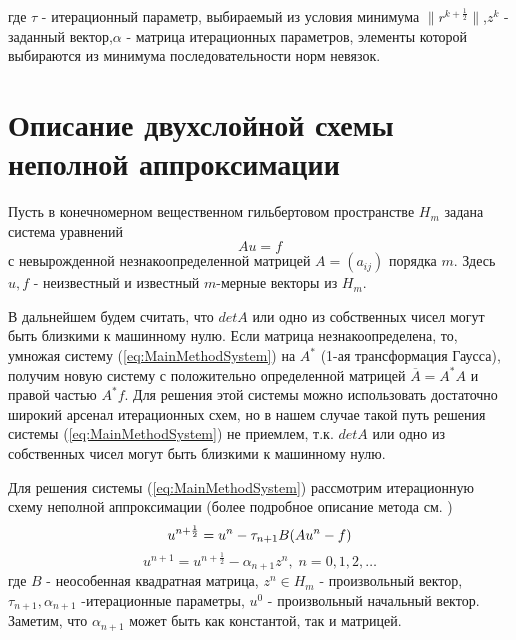 где $\tau$ - итерационный параметр, выбираемый из условия минимума $\|r^{k+\frac{1}{2}}\|$,$z^k$ - заданный вектор,$\alpha$ - матрица итерационных параметров, элементы которой выбираются из минимума последовательности норм невязок.

\newpage
\addtocounter{section}{1}
\setcounter{subsection}{0}
\setcounter{equation}{0}
\section*{Описание двухслойной схемы неполной аппроксимации}

Пусть в конечномерном вещественном гильбертовом пространстве $H_m$ задана система уравнений
\begin{equation}
    \label{eq:MainMethodSystem}
    Au=f
\end{equation}
с невырожденной незнакоопределенной матрицей $A=(a_{ij})$ порядка $m$. Здесь $u,f$ - неизвестный и известный $m$-мерные векторы из $H_m$.

В дальнейшем будем считать, что $det A$ или одно из собственных чисел могут быть близкими к машинному нулю. Если матрица незнакоопределена, то, умножая систему (\ref{eq:MainMethodSystem}) на $A^*$ (1-ая трансформация Гаусса), получим новую систему с положительно определенной матрицей $\overline{A}=A^{*}A$ и правой частью $A^{*}f$. Для решения этой системы можно использовать достаточно широкий арсенал итерационных схем, но в нашем случае такой путь решения системы (\ref{eq:MainMethodSystem}) не приемлем, т.к. $det A$ или одно из собственных чисел могут быть близкими к машинному нулю.

Для решения системы (\ref{eq:MainMethodSystem}) рассмотрим итерационную схему неполной аппроксимации (более подробное описание метода см. \cite{zakharov})
\begin{equation}
    \label{eq:FirstTheoryMethodStep}
    u^{n+\frac{1}{2}}=u^n-\tau_{n+1}B(Au^n-f)\\
\end{equation}
\begin{equation}
    \label{eq:SecondTheoryMethodStep}
    u^{n+1}=u^{n+\frac{1}{2}}-\alpha_{n+1}z^n,\;n=0,1,2,\ldots
\end{equation}
где $B$ - неособенная квадратная матрица, $z^n\in H_m$ - произвольный вектор, $\tau_{n+1},\alpha_{n+1}$ -итерационные параметры, $u^0$ - произвольный начальный вектор. Заметим, что $\alpha_{n+1}$ может быть как константой, так и матрицей.


